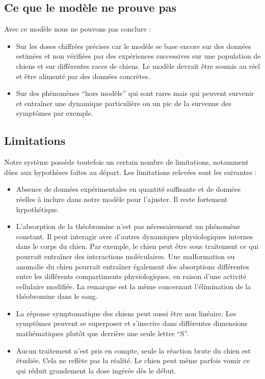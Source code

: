 \documentclass[11pt,a4paper]{article}
\begin{document}
\subsection{Ce que le modèle ne prouve pas}

Avec ce modèle nous ne pouvons pas conclure :

\begin{itemize}
    \item {Sur les doses chiffrées précises car le modèle se base encore sur des données 
    estimées et non vérifiées par des expériences successives sur une population de chiens 
    et sur différentes races de chiens. Le modèle devrait être soumis au réel et être 
    alimenté par des données concrètes.}
    \item {Sur des phénomènes “hors modèle” qui sont rares mais qui peuvent survenir et 
    entraîner une dynamique particulière ou un pic de la survenue des symptômes par exemple.}
\end{itemize}

\subsection{Limitations}

Notre système possède toutefois un certain nombre de limitations, notamment dûes aux 
hypothèses faites au départ. Les limitations relevées sont les suivantes :

\begin{itemize}
    \item Absence de données expérimentales en quantité suffisante et de données réelles à 
    inclure dans notre modèle pour l'ajuster. Il reste fortement hypothétique.
    \item L'absorption de la théobromine n'est pas nécessairement un phénomène constant. 
    Il peut interagir avec d'autres dynamiques physiologiques internes dans le corps du 
    chien. Par exemple, le chien peut être sous traitement ce qui pourrait entraîner des 
    interactions moléculaires. Une malformation ou anomalie du chien pourrait entraîner 
    également des absorptions différentes entre les différents compartiments physiologiques, 
    en raison d'une activité cellulaire modifiée. La remarque est la même concernant 
    l'élimination de la théobromine dans le sang.
    \item La réponse symptomatique des chiens peut aussi être non linéaire. Les symptômes 
    peuvent se superposer et s'inscrire dans différentes dimensions mathématiques plutôt 
    que derrière une seule lettre “S”.
    \item Aucun traitement n'est pris en compte, seule la réaction brute du chien est 
    étudiée. Cela ne reflète pas la réalité. Le chien peut même parfois vomir ce qui réduit 
    grandement la dose ingérée dès le début. 
\end{itemize}
\end{document}
